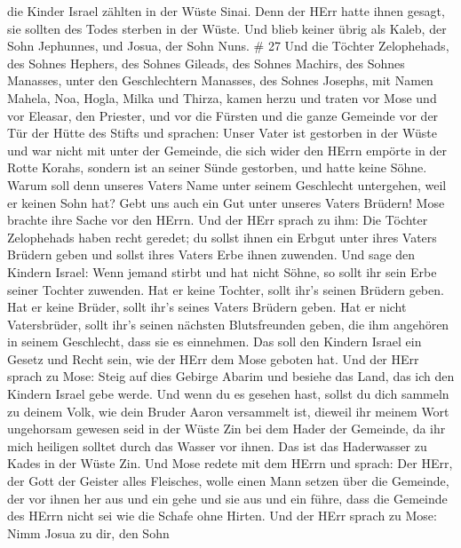 die Kinder Israel zählten in der Wüste Sinai.  Denn der
HErr hatte ihnen gesagt, sie sollten des Todes sterben in der Wüste. Und
blieb keiner übrig als Kaleb, der Sohn Jephunnes, und Josua, der Sohn
Nuns. \# 27  Und die Töchter Zelophehads, des Sohnes
Hephers, des Sohnes Gileads, des Sohnes Machirs, des Sohnes Manasses,
unter den Geschlechtern Manasses, des Sohnes Josephs, mit Namen Mahela,
Noa, Hogla, Milka und Thirza, kamen herzu  und traten vor
Mose und vor Eleasar, den Priester, und vor die Fürsten und die ganze
Gemeinde vor der Tür der Hütte des Stifts und sprachen: 
Unser Vater ist gestorben in der Wüste und war nicht mit unter der
Gemeinde, die sich wider den HErrn empörte in der Rotte Korahs, sondern
ist an seiner Sünde gestorben, und hatte keine Söhne.  Warum
soll denn unseres Vaters Name unter seinem Geschlecht untergehen, weil
er keinen Sohn hat? Gebt uns auch ein Gut unter unseres Vaters Brüdern!
 Mose brachte ihre Sache vor den HErrn.  Und der
HErr sprach zu ihm:  Die Töchter Zelophehads haben recht
geredet; du sollst ihnen ein Erbgut unter ihres Vaters Brüdern geben und
sollst ihres Vaters Erbe ihnen zuwenden.  Und sage den
Kindern Israel: Wenn jemand stirbt und hat nicht Söhne, so sollt ihr
sein Erbe seiner Tochter zuwenden.  Hat er keine Tochter,
sollt ihr's seinen Brüdern geben.  Hat er keine Brüder,
sollt ihr's seines Vaters Brüdern geben.  Hat er nicht
Vatersbrüder, sollt ihr's seinen nächsten Blutsfreunden geben, die ihm
angehören in seinem Geschlecht, dass sie es einnehmen. Das soll den
Kindern Israel ein Gesetz und Recht sein, wie der HErr dem Mose geboten
hat.  Und der HErr sprach zu Mose: Steig auf dies Gebirge
Abarim und besiehe das Land, das ich den Kindern Israel gebe werde.
 Und wenn du es gesehen hast, sollst du dich sammeln zu
deinem Volk, wie dein Bruder Aaron versammelt ist,  dieweil
ihr meinem Wort ungehorsam gewesen seid in der Wüste Zin bei dem Hader
der Gemeinde, da ihr mich heiligen solltet durch das Wasser vor ihnen.
Das ist das Haderwasser zu Kades in der Wüste Zin.  Und
Mose redete mit dem HErrn und sprach:  Der HErr, der Gott
der Geister alles Fleisches, wolle einen Mann setzen über die Gemeinde,
 der vor ihnen her aus und ein gehe und sie aus und ein
führe, dass die Gemeinde des HErrn nicht sei wie die Schafe ohne Hirten.
 Und der HErr sprach zu Mose: Nimm Josua zu dir, den Sohn
